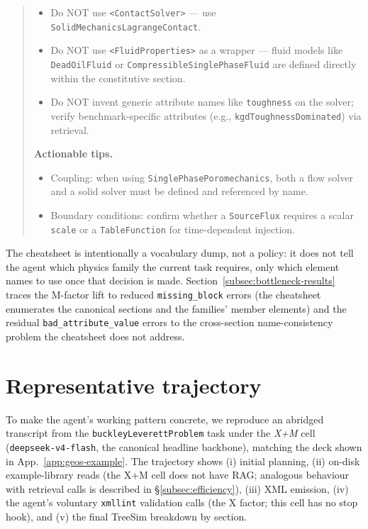 \documentclass{article}
\begin{document}
\begin{quote}
\begin{itemize}
\item Do NOT use \texttt{<ContactSolver>} --- use \texttt{SolidMechanicsLagrangeContact}.
\item Do NOT use \texttt{<FluidProperties>} as a wrapper --- fluid models like \texttt{DeadOilFluid} or \texttt{CompressibleSinglePhaseFluid} are defined directly within the constitutive section.
\item Do NOT invent generic attribute names like \texttt{toughness} on the solver; verify benchmark-specific attributes (e.g., \texttt{kgdToughnessDominated}) via retrieval.
\end{itemize}
\textbf{Actionable tips.}\\
\begin{itemize}
\item Coupling: when using \texttt{SinglePhasePoromechanics}, both a flow solver and a solid solver must be defined and referenced by name.
\item Boundary conditions: confirm whether a \texttt{SourceFlux} requires a scalar \texttt{scale} or a \texttt{TableFunction} for time-dependent injection.
\end{itemize}
\end{quote}

The cheatsheet is intentionally a vocabulary dump, not a policy: it does not tell the agent which physics family the current task requires, only which element names to use once that decision is made. Section~\ref{subsec:bottleneck-results} traces the M-factor lift to reduced \texttt{missing\_block} errors (the cheatsheet enumerates the canonical sections and the families' member elements) and the residual \texttt{bad\_attribute\_value} errors to the cross-section name-consistency problem the cheatsheet does not address.


\section{Representative trajectory}
\label{app:case-study}

To make the agent's working pattern concrete, we reproduce an abridged transcript from the \texttt{buckleyLeverettProblem} task under the \emph{X+M} cell (\texttt{deepseek-v4-flash}, the canonical headline backbone), matching the deck shown in App.~\ref{app:geos-example}. The trajectory shows (i) initial planning, (ii) on-disk example-library reads (the X+M cell does not have RAG; analogous behaviour with retrieval calls is described in \S\ref{subsec:efficiency}), (iii) XML emission, (iv) the agent's voluntary \texttt{xmllint} validation calls (the X factor; this cell has no stop hook), and (v) the final TreeSim breakdown by section.
\end{document}
